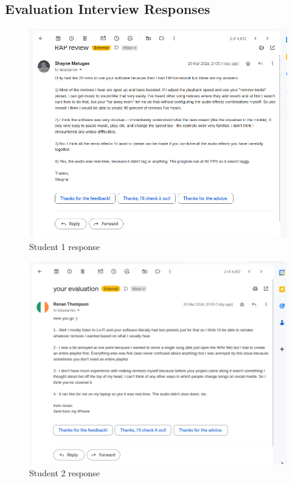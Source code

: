 \documentclass{article}
\begin{document}
	\subsection{Evaluation Interview Responses}
	\begin{figure}[H]
		\includegraphics[width=14cm]{./shayne evaluation.png}
		\caption{Student 1 response}
	\end{figure}
	\begin{figure}[H]
		\includegraphics[width=14cm]{./ronan evaluation.png}
		\caption{Student 2 response}
	\end{figure}
\end{document}
